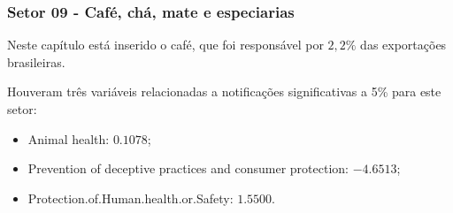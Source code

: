 % 
% 
%  
% 
% 
% 
% 
% 
%  
% 
% 
% 
% 
% 
%  
% 
% 
% 
\subsubsection{Setor 09 - Café, chá, mate e especiarias}


 

Neste capítulo está inserido o café, que foi responsável por $2,2\%$ das exportações brasileiras.

Houveram três variáveis relacionadas a notificações significativas a 5\% para este setor: 
\begin{itemize}
    \item Animal health: $0.1078$;
    \item Prevention of deceptive practices and consumer protection: $-4.6513$;
    \item Protection.of.Human.health.or.Safety: $1.5500$.
\end{itemize}

